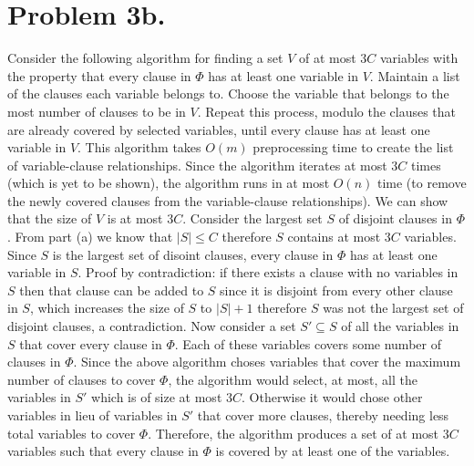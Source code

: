 \documentclass[12pt]{article}
\begin{document}
\section*{Problem 3b.}
Consider the following algorithm for finding a set $V$ of at most $3C$ variables
with the property that every clause in $\Phi$ has at least one variable in $V$.
Maintain a list of the clauses each variable belongs to. Choose the variable
that belongs to the most number of clauses to be in $V$. Repeat this process,
modulo the clauses that are already covered by selected variables, until every
clause has at least one variable in $V$. This algorithm takes $O(m)$
preprocessing time to create the list of variable-clause relationships. Since
the algorithm iterates at most $3C$ times (which is yet to be shown), the
algorithm runs in at most $O(n)$ time (to remove the newly covered clauses from
the variable-clause relationships). We can show that the size of $V$ is at most
$3C$. Consider the largest set $S$ of disjoint clauses in $\Phi$. From part (a)
we know that $|S| \le C$ therefore $S$ contains at most $3C$ variables. Since
$S$ is the largest set of disoint clauses, every clause in $\Phi$ has at least
one variable in $S$. Proof by contradiction: if there exists a clause with no
variables in $S$ then that clause can be added to $S$ since it is disjoint from
every other clause in $S$, which increases the size of $S$ to $|S|+1$ therefore
$S$ was not the largest set of disjoint clauses, a contradiction. Now consider a
set $S' \subseteq S$ of all the variables in $S$ that cover every clause in
$\Phi$. Each of these variables covers some number of clauses in $\Phi$.
Since the above algorithm choses variables that cover the maximum number of
clauses to cover $\Phi$, the algorithm would select, at most, all the variables
in $S'$ which is of size at most $3C$. Otherwise it would chose other variables
in lieu of variables in $S'$ that cover more clauses, thereby needing less total
variables to cover $\Phi$. Therefore, the algorithm produces a set of at most
$3C$ variables such that every clause in $\Phi$ is covered by at least one
of the variables.
\end{document}

